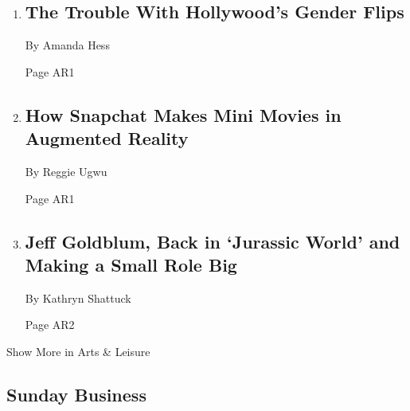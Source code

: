 \begin{enumerate}
\def\labelenumi{\arabic{enumi}.}
\item
  \href{/2018/06/12/movies/oceans-8-gender-swap.html}{}

  \hypertarget{the-trouble-with-hollywoods-gender-flips}{%
  \subsection{The Trouble With Hollywood's Gender
  Flips}\label{the-trouble-with-hollywoods-gender-flips}}

  By Amanda Hess

  Page AR1
\item
  \href{/2018/06/14/movies/snapchat-3d-bitmoji-animation-augmented-reality.html}{}

  \hypertarget{how-snapchat-makes-mini-movies-in-augmented-reality}{%
  \subsection{How Snapchat Makes Mini Movies in Augmented
  Reality}\label{how-snapchat-makes-mini-movies-in-augmented-reality}}

  By Reggie Ugwu

  Page AR1
\item
  \href{/2018/06/15/movies/jeff-goldblum-jurassic-world.html}{}

  \hypertarget{jeff-goldblum-back-in-jurassic-world-and-making-a-small-role-big}{%
  \subsection{Jeff Goldblum, Back in `Jurassic World' and Making a Small
  Role
  Big}\label{jeff-goldblum-back-in-jurassic-world-and-making-a-small-role-big}}

  By Kathryn Shattuck

  Page AR2
\end{enumerate}

Show More in Arts \& Leisure

\hypertarget{sunday-business}{%
\subsection{Sunday Business}\label{sunday-business}}

